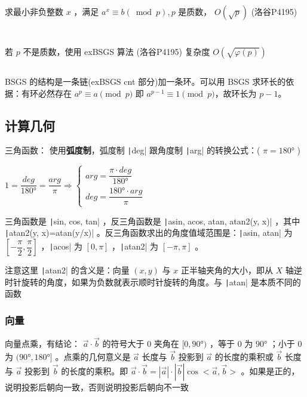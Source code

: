 \documentclass[twocolumn,10pt]{ctexart}
\begin{document}
求最小非负整数 $x$ ，满足 $a^x\equiv b(\bmod p), p$ 是质数， $O(\sqrt p)$  (洛谷P4195)

\inputminted{cpp}{code/p3846_bsgs2.cpp}

\inputminted{cpp}{code/ext_009.cpp}

若 $p$ 不是质数，使用 exBSGS 算法 (洛谷P4195) 复杂度 $O(\sqrt{\varphi(p)})$

\inputminted{cpp}{code/ext_010.cpp}

BSGS 的结构是一条链(exBSGS cnt 部分)加一条环。可以用 BSGS 求环长的依据：有环必然存在 $a^p\equiv a\pmod p$ 即 $a^{p-1}\equiv 1\pmod p$，故环长为 $p-1$。

\subsection{计算几何}

三角函数： 使用\textbf{弧度制}，弧度制 \texttt|deg| 跟角度制 \texttt|arg| 的转换公式：( $\pi=180°$ )

\begin{adjustbox}{max width=\linewidth,center}
$1=\dfrac{deg}{180°}=\dfrac{arg}{\pi}\Rightarrow 
\begin{cases}
arg=\dfrac{\pi\cdot deg}{180°}\\
deg=\dfrac{180°\cdot arg}{\pi}
\end{cases}$
\end{adjustbox}

三角函数是 \texttt|sin, cos, tan| ，反三角函数是 \texttt|asin, acos, atan, atan2(y, x)| ，其中 \texttt|atan2(y, x)=atan(y/x)| 。反三角函数求出的角度值域范围是：\texttt|asin, atan| 为 $[-\dfrac\pi2,\dfrac\pi2]$ ，\texttt|acos| 为 $[0,\pi]$ ，\texttt|atan2| 为 $[-\pi,\pi]$ 。

注意这里 \texttt|atan2| 的含义是：向量 $(x,y)$ 与 $x$ 正半轴夹角的大小，即从 $X$ 轴逆时针旋转的角度，如果为负数就表示顺时针旋转的角度。与 \texttt|atan| 是本质不同的函数

\subsubsection{向量}

向量点乘，有结论： $\vec a\cdot \vec b$ 的符号大于 $0$ 夹角在 $[0,90°)$ ，等于 $0$ 为 $90°$ ；小于 $0$ 为 $(90°,180°]$ 。点乘的几何意义是 $\vec a$ 长度与 $\vec b$ 投影到 $\vec a$ 的长度的乘积或 $\vec b$ 长度与 $\vec a$ 投影到 $\vec b$ 的长度的乘积。即 $\vec a\cdot \vec b=|\vec a|\cdot|\vec b|\cos<\vec a,\allowbreak{}\vec b>$ 。如果是正的，说明投影后朝向一致，否则说明投影后朝向不一致
\end{document}
